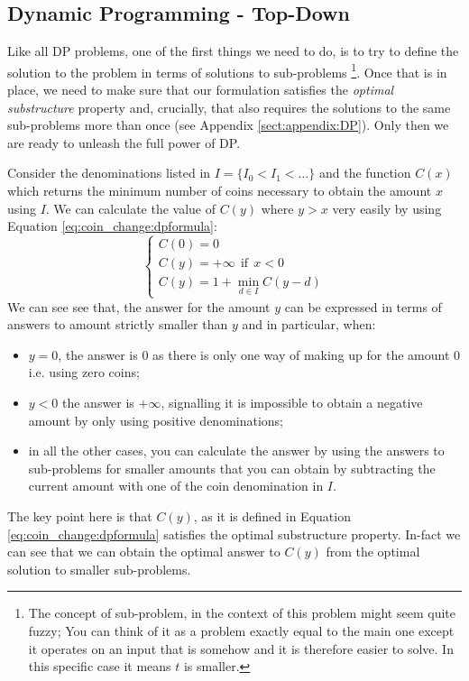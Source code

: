 \subsection{Dynamic Programming - Top-Down}
\label{sec:coin_change:topdown}
Like all DP problems, one of the first things we need to do, is to try to define the solution to the problem in terms of solutions to sub-problems
\footnote{The concept of sub-problem, in the context of this problem might seem quite fuzzy; You can think of it as a problem exactly equal to the main one except it operates on an input that
is  somehow \textit{} and it is therefore easier to solve.
In this specific case it means $t$  is smaller.}.
Once that is in place, we need to make sure that our formulation satisfies the \textit{optimal substructure} property and, crucially, that also requires the solutions to the same sub-problems
more than once (see Appendix \ref{sect:appendix:DP}). 
Only then we are ready to unleash the full power of DP.

Consider the denominations listed in $I=\{I_0 < I_1 < \ldots \}$ and the function $C(x)$ which returns the minimum number of coins necessary to obtain the amount $x$ using $I$. 
We can calculate the value of $C(y)$ where $y > x$ very easily by using Equation \ref{eq:coin_change:dpformula}:
\begin{equation}
	\begin{cases}
		C(0) = 0 \\
		C(y) = +\infty \: \: \text{if} \: \: x < 0 \\
 		C(y) = 1 + \min_{d \in I} C(y-d)
	 \end{cases}
	\label{eq:coin_change:dpformula}
\end{equation}
We can see see that, the answer for the amount $y$ can be expressed in terms of answers to amount strictly smaller than $y$ and in particular, when:
\begin{itemize}
	\item $y=0$, the answer is $0$ as there is only one way of making up for the amount $0$ i.e. using zero coins;
	\item $y<0$ the answer is $+\infty$, signalling it is impossible to obtain a negative amount by only using positive denominations;
	\item in all the other cases, you can calculate the answer by using the answers to sub-problems for smaller amounts that you can obtain by subtracting the current amount with one of the coin denomination in $I$.
\end{itemize} 
The key point here is that $C(y)$, as it is defined in Equation \ref{eq:coin_change:dpformula} satisfies the optimal substructure property.
In-fact we can see that we can obtain the optimal answer to $C(y)$ from the optimal solution to smaller sub-problems. 

